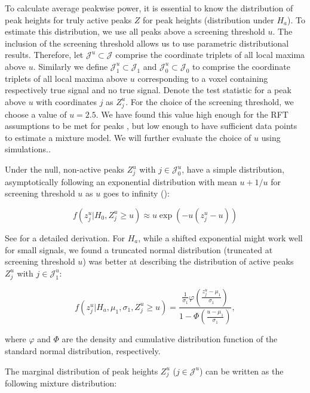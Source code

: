 To calculate average peakwise power, it is essential to know the distribution of peak heights for truly active peaks $Z$ for peak heights (distribution under $H_a$).
{\color{Cyan}To estimate this distribution, we use all peaks above a screening threshold $u$.  The inclusion of the screening threshold allows us to use parametric distributional results.  Therefore, let $\mathcal{J}^u \subset \mathcal{J}$ comprise the coordinate triplets of all local maxima above $u$.  Similarly we define $\mathcal{J}^u_1 \subset \mathcal{J}_1$ and $\mathcal{J}^u_0 \subset \mathcal{J}_0$ to comprise the coordinate triplets of all local maxima above $u$ corresponding to a voxel containing respectively true signal and no true signal.  Denote the test statistic for a peak above $u$ with coordinates $j$ as $Z^u_j$.
}
{\color{Cyan}For the choice of the screening threshold, we choose a value of $u=2.5$.  We have found this value high enough for the RFT assumptions to be met for peaks \citep{Durnez2014}, but low enough to have sufficient data points to estimate a mixture model.  We will further evaluate the choice of $u$ using simulations.}.

Under the null, non-active peaks $Z^u_j$ with $j \in \mathcal{J}_0^u$, have a simple distribution, asymptotically following an exponential distribution with mean $u+1/u$ for screening threshold $u$ as $u$ goes to infinity (\citealp{Worsley2007}):

\begin{equation}
f(z^u_j|H_0,Z^u_j\geq u) \approx u \exp(-u(z_j^u-u)) \label{null}
\end{equation}

See \citet{Durnez2014} for a detailed derivation.  For $H_a$, while a shifted exponential might work well for small signals, we found a truncated normal distribution (truncated at screening threshold $u$) was better at describing the distribution of active peaks {\color{Cyan}$Z^u_j$ with $j \in \mathcal{J}_1^u$}:

\begin{equation}
f(z^u_j|H_a,\mu_1,\sigma_1,Z^u_j\geq u) = \frac{\frac{1}{\sigma_1}\varphi \left( \frac{z^u_j-\mu_1}{\sigma_1} \right) } {{1-\Phi}\left( \frac{u-\mu_1}{\sigma_1} \right)}, \label{alternative}
\end{equation}

where $\varphi$ and $\Phi$ are the density and cumulative distribution function of the standard normal distribution, respectively.

The marginal distribution of peak heights {\color{Cyan}$Z^u_j$ ($j \in \mathcal{J}^u$)} can be written as the following mixture distribution:

